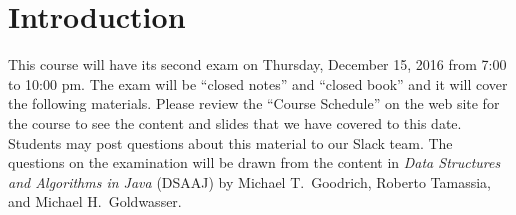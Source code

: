


\vspace*{-.35in}
\section*{Introduction}

This course will have its second exam on Thursday, December 15, 2016 from 7:00 to 10:00 pm. The exam will be ``closed
notes'' and ``closed book'' and it will cover the following materials. Please review the ``Course Schedule'' on the web
site for the course to see the content and slides that we have covered to this date. Students may post questions about
this material to our Slack team. The questions on the examination will be drawn from the content in {\em Data Structures
and Algorithms in Java\/} (DSAAJ) by Michael T.\ Goodrich, Roberto Tamassia, and Michael H.\ Goldwasser.

